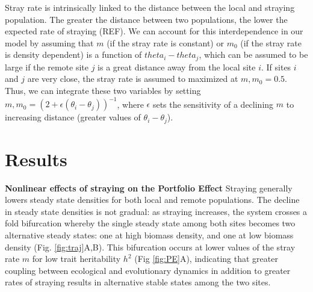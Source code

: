 \documentclass[twocolumn,preprintnumbers,amsmath,amssymb,superscriptaddress]{revtex4}
\begin{document}
Stray rate is intrinsically linked to the distance between the local and straying population.
The greater the distance between two populations, the lower the expected rate of straying (REF).
We can account for this interdependence in our model by assuming that $m$ (if the stray rate is constant) or $m_0$ (if the stray rate is density dependent) is a function of $theta_i-theta_j$, which can be assumed to be large if the remote site $j$ is a great distance away from the local site $i$.
If sites $i$ and $j$ are very close, the stray rate is assumed to maximized at $m,m_0 = 0.5$.
Thus, we can integrate these two variables by setting $m,m_0 = (2 + \epsilon (\theta_i-\theta_j))^{-1}$, where $\epsilon$ sets the sensitivity of a declining $m$ to increasing distance (greater values of $\theta_i-\theta_j$).



\section*{Results}




{\bf Nonlinear effects of straying on the Portfolio Effect} Straying generally lowers steady state densities for both local and remote populations. %
The decline in steady state densities is not gradual: as straying increases, the system crosses a fold bifurcation whereby the single steady state among both sites becomes two alternative steady states: one at high biomass density, and one at low biomass density (Fig. \ref{fig:traj}A,B).
This bifurcation occurs at lower values of the stray rate $m$ for low trait heritability $h^2$ (Fig \ref{fig:PE}A), indicating that greater coupling between ecological and evolutionary dynamics in addition to greater rates of straying results in alternative stable states among the two sites.
\end{document}
